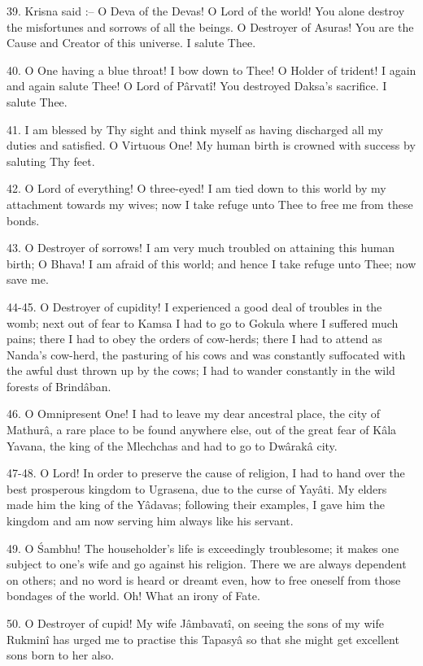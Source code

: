 39. Krisna said :-- O Deva of the Devas! O Lord of the world! You alone destroy the misfortunes and sorrows of all the beings. O Destroyer of Asuras! You are the Cause and Creator of this universe. I salute Thee.

40. O One having a blue throat! I bow down to Thee! O Holder of trident! I again and again salute Thee! O Lord of P\^arvat\^i! You destroyed Daksa's sacrifice. I salute Thee.

41. I am blessed by Thy sight and think myself as having discharged all my duties and satisfied. O Virtuous One! My human birth is crowned with success by saluting Thy feet.

42. O Lord of everything! O three-eyed! I am tied down to this world by my attachment towards my wives; now I take refuge unto Thee to free me from these bonds.

43. O Destroyer of sorrows! I am very much troubled on attaining this human birth; O Bhava! I am afraid of this world; and hence I take refuge unto Thee; now save me.

44-45. O Destroyer of cupidity! I experienced a good deal of troubles in the womb; next out of fear to Kamsa I had to go to Gokula where I suffered much pains; there I had to obey the orders of cow-herds; there I had to attend as Nanda's cow-herd, the pasturing of his cows and was constantly suffocated with the awful dust thrown up by the cows; I had to wander constantly in the wild forests of Brind\^aban.

46. O Omnipresent One! I had to leave my dear ancestral place, the city of Mathur\^a, a rare place to be found anywhere else, out of the great fear of K\^ala Yavana, the king of the Mlechchas and had to go to Dw\^arak\^a city.

47-48. O Lord! In order to preserve the cause of religion, I had to hand over the best prosperous kingdom to Ugrasena, due to the curse of Yay\^ati. My elders made him the king of the Y\^adavas; following their examples, I gave him the kingdom and am now serving him always like his servant.

49. O \'Sambhu! The householder's life is exceedingly troublesome;  it makes one subject to one's wife and go against his religion. There we are always dependent on others; and no word is heard or dreamt even, how to free oneself from those bondages of the world. Oh! What an irony of Fate.

50. O Destroyer of cupid! My wife J\^ambavat\^i, on seeing the sons of my wife Rukmin\^i has urged me to practise this Tapasy\^a so that she might get excellent sons born to her also.

